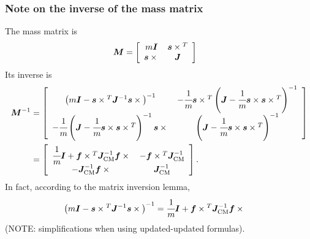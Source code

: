 \documentclass[10pt,dvips,fleqn,subeqn]{report}
\newcommand{\T}[1]{\bm{#1}}
\newcommand{\TT}[1]{\bm{#1}}
\begin{document}
\subsubsection{Note on the inverse of the mass matrix}
The mass matrix is
\begin{align}
	\TT{M}
	&=
	\sqbr{\matr{cc}{
		m \TT{I} & \T{s}\times{}^T
		\\
		\T{s}\times{} & \TT{J}
	}}
\end{align}
Its inverse is
\begin{align}
	\TT{M}^{-1}
	&=
	\sqbr{\matr{cc}{
		\plbr{
			m \TT{I}
			-
			\T{s}\times{}^T \TT{J}^{-1} \TT{s}\times{}
		}^{-1}
		&
		-\cfrac{1}{m}\T{s}\times{}^T \plbr{
			\TT{J}
			-
			\cfrac{1}{m} \T{s}\times \T{s} \times{}^T
		}^{-1}
		\\
		-\cfrac{1}{m} \plbr{
			\TT{J}
			-
			\cfrac{1}{m} \T{s}\times \T{s} \times{}^T
		}^{-1} \T{s}\times{}
		&
		\plbr{
			\TT{J}
			-
			\cfrac{1}{m} \T{s}\times \T{s}\times{}^T
		}^{-1}
	}}
	\nonumber \\
	&=
	\sqbr{\matr{cc}{
		\cfrac{1}{m} \TT{I}
		+
		\T{f}\times{}^T \TT{J}_\text{CM}^{-1} \T{f}\times{}
		&
		-\T{f}\times{}^T \TT{J}_\text{CM}^{-1}
		\\
		- \TT{J}_\text{CM}^{-1}\T{f}\times{}
		&
		\TT{J}_\text{CM}^{-1}
	}}
	.
\end{align}
In fact, according to the matrix inversion lemma,
\begin{align}
	\plbr{
		m \TT{I}
		-
		\T{s} \times{}^T \TT{J}^{-1} \T{s}\times{}
	}^{-1}
	&=
	\cfrac{1}{m} \TT{I}
	+
	\T{f}\times{}^T \TT{J}_\text{CM}^{-1} \T{f}\times{}
\end{align}
(NOTE: simplifications when using updated-updated formulas).
\end{document}
